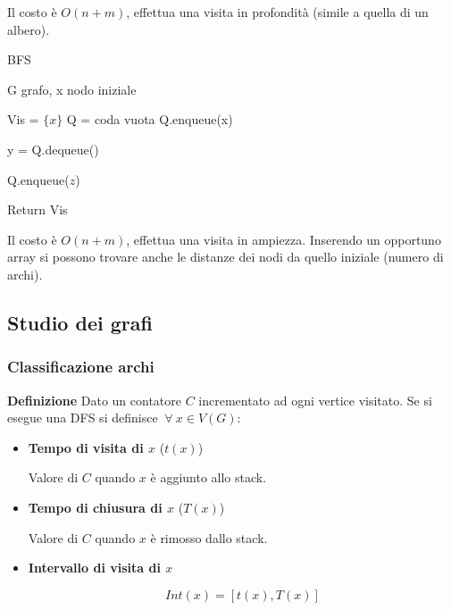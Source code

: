 \documentclass{article}
\begin{document}
\noindent Il costo è $O(n+m)$, effettua una visita in profondità (simile a quella di un albero).\newline\newline

\begin{algorithm}[ht]
\caption{BFS}
\begin{algorithmic}

\State G grafo, x nodo iniziale
\State

\State Vis = $\{x\}$
\State Q = coda vuota
\State Q.enqueue(x)
\State

    \State y = Q.dequeue()

    

            \State Q.enqueue($z$)

        \EndIf
    \EndFor
    
\EndWhile

\State
\State Return Vis

\end{algorithmic}
\end{algorithm}

\noindent Il costo è $O(n+m)$, effettua una visita in ampiezza. Inserendo un opportuno array si possono trovare anche le distanze dei nodi da quello iniziale (numero di archi).\newline

\subsection{Studio dei grafi}

\subsubsection{Classificazione archi}

\textbf{Definizione} Dato un contatore $C$ incrementato ad ogni vertice visitato. Se si esegue una DFS si definisce $\ \forall\ x\in V(G)$:
\begin{itemize}
    \item \textbf{Tempo di visita di $x$ } ($t(x)$)

        Valore di $C$ quando $x$ è aggiunto allo stack.

    \item \textbf{Tempo di chiusura di $x$ } ($T(x)$)

        Valore di $C$ quando $x$ è rimosso dallo stack.

    \item \textbf{Intervallo di visita di $x$}

        $$Int(x)=[t(x),T(x)]$$\newline
    
\end{itemize}
\end{document}
